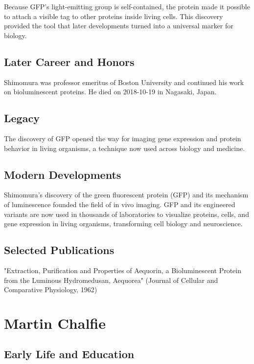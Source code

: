 Because GFP's light-emitting group is self-contained, the protein made it possible to attach a visible tag to other proteins inside living cells. This discovery provided the tool that later developments turned into a universal marker for biology.

\subsection*{Later Career and Honors}

Shimomura was professor emeritus of Boston University and continued his work on bioluminescent proteins. He died on 2018-10-19 in Nagasaki, Japan.

\subsection*{Legacy}

The discovery of GFP opened the way for imaging gene expression and protein behavior in living organisms, a technique now used across biology and medicine.

\subsection*{Modern Developments}

Shimomura's discovery of the green fluorescent protein (GFP) and its mechanism of luminescence founded the field of in vivo imaging. GFP and its engineered variants are now used in thousands of laboratories to visualize proteins, cells, and gene expression in living organisms, transforming cell biology and neuroscience.

\subsection*{Selected Publications}

"Extraction, Purification and Properties of Aequorin, a Bioluminescent Protein from the Luminous Hydromedusan, Aequorea" (Journal of Cellular and Comparative Physiology, 1962)

\clearpage

\section{Martin Chalfie}

\subsection*{Early Life and Education}

